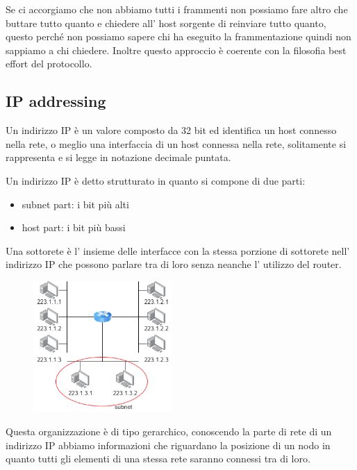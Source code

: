 Se ci accorgiamo che non abbiamo tutti i frammenti non possiamo fare altro che buttare tutto quanto e chiedere all' host sorgente di reinviare tutto quanto, questo perché non possiamo sapere chi ha eseguito la frammentazione quindi non sappiamo a chi chiedere.
Inoltre questo approccio è coerente con la filosofia best effort del protocollo.


\subsection{IP addressing}
Un  indirizzo IP è un valore composto da 32 bit ed identifica un host connesso nella rete, o meglio una interfaccia di un host connessa nella rete, solitamente si rappresenta e si legge in notazione decimale puntata.

Un indirizzo IP è detto strutturato in quanto si compone di due parti:
\begin{itemize}
    \item subnet part: i bit più alti
    \item host part: i bit più bassi
\end{itemize}
Una sottorete è l' insieme delle interfacce con la stessa porzione di sottorete nell' indirizzo IP che possono parlare tra di loro senza neanche l' utilizzo del router.
\begin{figure}[H]
    \centering
    \includegraphics[width=200px]{images/5_Internetworking/subnet.png}
\end{figure}

Questa organizzazione è di tipo gerarchico, conoscendo la parte di rete di un indirizzo IP abbiamo informazioni che riguardano la posizione di un nodo in quanto tutti gli elementi di una stessa rete saranno connessi tra di loro.

